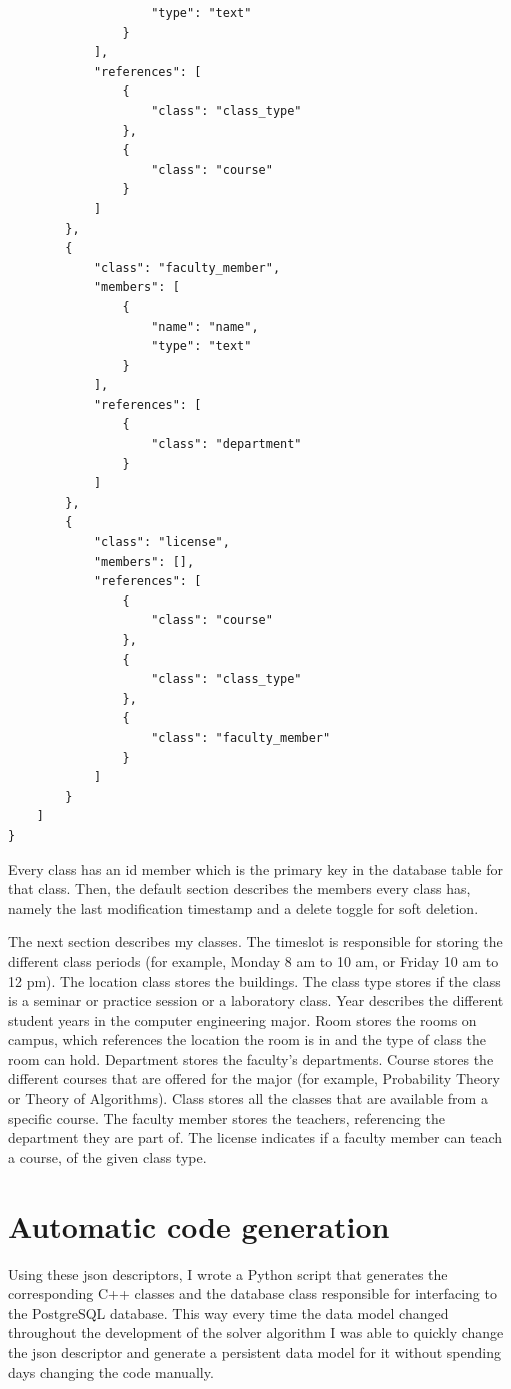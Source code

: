 \begin{lstlisting}
                    "type": "text"
                }
            ],
            "references": [
                {
                    "class": "class_type"
                },
                {
                    "class": "course"
                }
            ]
        },
        {
            "class": "faculty_member",
            "members": [
                {
                    "name": "name",
                    "type": "text"
                }
            ],
            "references": [
                {
                    "class": "department"
                }
            ]
        },
        {
            "class": "license",
            "members": [],
            "references": [
                {
                    "class": "course"
                },
                {
                    "class": "class_type"
                },
                {
                    "class": "faculty_member"
                }
            ]
        }
    ]
}
\end{lstlisting}

Every class has an id member which is the primary key in the database table for that class. Then, the default section describes the members every class has, namely the last modification timestamp and a delete toggle for soft deletion.

The next section describes my classes. The timeslot is responsible for storing the different class periods (for example, Monday 8 am to 10 am, or Friday 10 am to 12 pm). The location class stores the buildings. The class type stores if the class is a seminar or practice session or a laboratory class. Year describes the different student years in the computer engineering major. Room stores the rooms on campus, which references the location the room is in and the type of class the room can hold. Department stores the faculty's departments. Course stores the different courses that are offered for the major (for example, Probability Theory or Theory of Algorithms). Class stores all the classes that are available from a specific course. The faculty member stores the teachers, referencing the department they are part of. The license indicates if a faculty member can teach a course, of the given class type.

\section{Automatic code generation}

Using these json descriptors, I wrote a Python script that generates the corresponding C++ classes and the database class responsible for interfacing to the PostgreSQL database. This way every time the data model changed throughout the development of the solver algorithm I was able to quickly change the json descriptor and generate a persistent data model for it without spending days changing the code manually.

